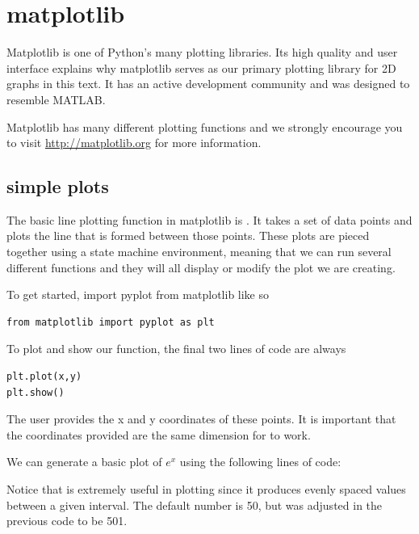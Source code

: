  \label{lab:Matplotlib and Mayavi}

\section*{matplotlib}

Matplotlib is one of Python's many plotting libraries. Its high quality
and user interface explains why matplotlib serves as our primary
plotting library for 2D graphs in this text. It has an active
development community and was designed to resemble MATLAB.

Matplotlib has many different plotting functions and we strongly
encourage you to visit \url{http://matplotlib.org} for more
information.

\subsection*{simple plots} 

The basic line plotting function in matplotlib is . It takes a
set of data points and plots the line that is formed between those points. 
These plots are pieced together using a state machine environment, meaning that 
we can run several different functions and they will all display or modify the 
plot we are creating. 

To get started, import pyplot from matplotlib like so
\begin{lstlisting} 
from matplotlib import pyplot as plt
\end{lstlisting}

To plot and show our function, the final two lines of code are always
\begin{lstlisting} 
plt.plot(x,y) 
plt.show() 
\end{lstlisting}

The user provides the x and y coordinates of these points. It is important that the 
coordinates provided are the same dimension for  to work. 

We can generate a basic plot of $e^x$ using the following lines of code:


Notice that  is extremely useful in plotting since it produces evenly spaced values 
between a given interval. The default number is 50, but was adjusted in the previous 
code to be 501. 

